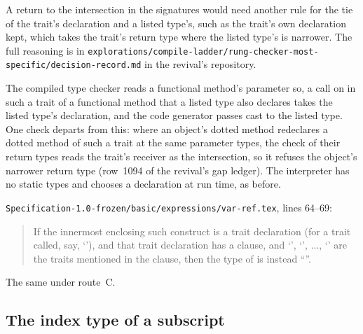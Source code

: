 \begin{description}
A return to the intersection in the signatures would need another rule for the
tie of the trait's declaration and a listed type's, such as the trait's own
declaration kept, which takes the trait's return type where the listed type's is
narrower.
The full reasoning is in
\nolinkurl{explorations/compile-ladder/rung-checker-most-specific/decision-record.md}
in the revival's repository.
\item[Effect] The compiled type checker reads a functional method's 
parameter so, a call on  in such a trait of a functional method that a
listed type also declares takes the listed type's declaration, and the code
generator passes  cast to the listed type.
One check departs from this: where an object's dotted method redeclares a dotted
method of such a trait at the same parameter types, the check of their return
types reads the trait's receiver as the intersection, so it refuses the
object's narrower return type (row~1094 of the revival's gap ledger).
The interpreter has no static types and chooses a declaration at run time, as
before.
\item[Original text] \nolinkurl{Specification-1.0-frozen/basic/expressions/var-ref.tex},
lines 64--69:
\begin{quote}
If the innermost enclosing such construct is a trait declaration (for a trait
called, say, `'), and that trait declaration has a 
clause, and `', `', ..., `' are the traits mentioned
in the  clause, then the type of  is instead
``''.
\end{quote}
\item[Route C] The same under route~C.
\end{description}

\subsection{The index type of a subscript}

